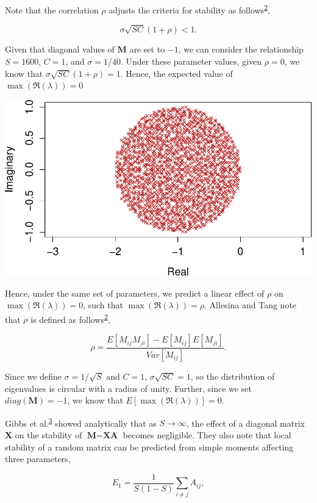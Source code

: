\documentclass[]{article}
\begin{document}
Note that the correlation \(\rho\) adjusts the criteria for stability as
follows\textsuperscript{\protect\hyperlink{ref-Allesina2015a}{2}},

\[\sigma\sqrt{SC}\left(1 + \rho\right) < 1.\]

Given that diagonal values of \(\textbf{M}\) are set to \(-1\), we can
consider the relationship \(S = 1600\), \(C = 1\), and
\(\sigma = 1/40\). Under these parameter values, given \(\rho = 0\), we
know that \(\sigma\sqrt{SC}\left(1 + \rho\right) = 1\). Hence, the
expected value of \(\max(\Re(\lambda)) = 0\)

\includegraphics{revision_notes_files/figure-latex/unnamed-chunk-3-1.pdf}

Hence, under the same set of parameters, we predict a linear effect of
\(\rho\) on \(\max(\Re(\lambda)) = 0\), such that
\(\max(\Re(\lambda)) = \rho\). Allesina and Tang note that \(\rho\) is
defined as
follows\textsuperscript{\protect\hyperlink{ref-Allesina2015a}{2}},

\[\rho = \frac{E[M_{ij}M_{ji}] - E[M_{ij}]E[M_{ji}]}{Var[M_{ij}]}.\]

Since we define \(\sigma = 1/\sqrt{S}\) and \(C = 1\),
\(\sigma\sqrt{SC} = 1\), so the distribution of eigenvalues is circular
with a radius of unity. Further, since we set \(diag(\textbf{M}) = -1\),
we know that \(E[\max(\Re(\lambda))] = 0\).

Gibbs et al.\textsuperscript{\protect\hyperlink{ref-Gibbs2017}{3}}
showed analytically that as \(S \to \infty\), the effect of a diagonal
matrix \(\textbf{X}\) on the stability of \(\textbf{M} = \textbf{XA}\)
becomes negligible. They also note that local stability of a random
matrix can be predicted from simple moments affecting three parameters,

\[E_{1} = \frac{1}{S(1-S)}\sum_{i \neq j}A_{ij},\]
\end{document}
